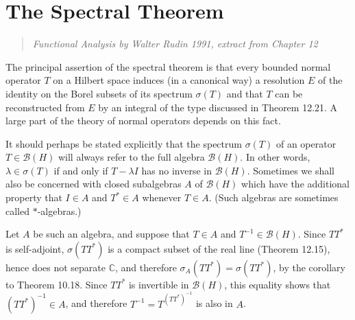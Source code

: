 %













\section{The Spectral Theorem}


\begin{quotation}
  \emph{Functional Analysis by Walter Rudin 1991, extract from Chapter 12}
\end{quotation}

The principal assertion of the spectral theorem is that every bounded normal operator $T$ on a Hilbert space induces (in a canonical way) a resolution $E$ of the identity on the Borel subsets of its spectrum $\sigma(T)$ and that $T$ can be reconstructed from $E$ by an integral of the type discussed in Theorem 12.21.
A large part of the theory of normal operators depends on this fact.

It should perhaps be stated explicitly that the spectrum $\sigma(T)$ of an operator $T \in \mathcal{B}(H)$ will always refer to the full algebra $\mathcal{B}(H)$.
In other words, $\lambda \in \sigma(T)$ if and only if $T - \lambda I$ has no inverse in $\mathcal{B}(H)$.
Sometimes we shall also be concerned with closed subalgebras $A$ of $\mathcal{B}(H)$ which have the additional property that $I \in A$ and $T^* \in A$ whenever $T \in A$. (Such algebras are sometimes called $*$-algebras.)

Let $A$ be such an algebra, and suppose that $T \in A$ and $T^{-1} \in \mathcal{B}(H)$.
Since $TT^*$ is self-adjoint, $\sigma(TT^*)$ is a compact subset of the real line (Theorem 12.15), hence does not separate $\mathbb{C}$, and therefore $\sigma_A(TT^*) = \sigma(TT^*)$, by the corollary to Theorem 10.18.
Since $TT^*$ is invertible in $\mathcal{B}(H)$, this equality shows that $(TT^*)^{-1} \in A$, and therefore $T^{-1} = T^(TT^*)^{-1}$ is also in $A$.

